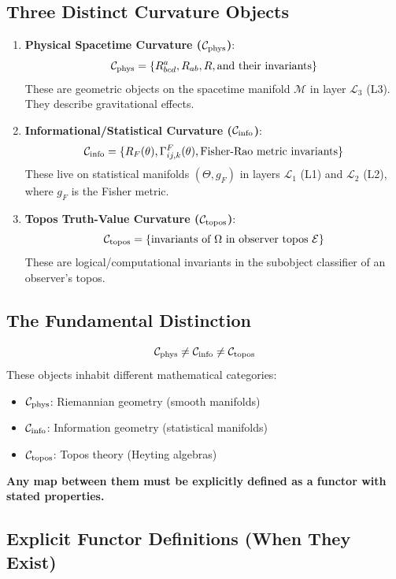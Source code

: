 \documentclass[11pt,titlepage]{article}
\newcommand{\protocol}{\mathcal{L}_1}
\newcommand{\logic}{\mathcal{L}_2}
\newcommand{\interface}{\mathcal{L}_3}
\begin{document}
\subsection{Three Distinct Curvature Objects}

\begin{enumerate}
    \item \textbf{Physical Spacetime Curvature ($\mathcal{C}_{\mathrm{phys}}$)}:
    \[
    \mathcal{C}_{\mathrm{phys}} = \{R^a_{bcd}, R_{ab}, R, \text{and their invariants}\}
    \]
    These are geometric objects on the spacetime manifold $\mathcal{M}$ in layer $\interface$ (L3). They describe gravitational effects.
    
    \item \textbf{Informational/Statistical Curvature ($\mathcal{C}_{\mathrm{info}}$)}:
    \[
    \mathcal{C}_{\mathrm{info}} = \{R_F(\theta), \Gamma^F_{ij,k}(\theta), \text{Fisher-Rao metric invariants}\}
    \]
    These live on statistical manifolds $(\Theta, g_F)$ in layers $\protocol$ (L1) and $\logic$ (L2), where $g_F$ is the Fisher metric.
    
    \item \textbf{Topos Truth-Value Curvature ($\mathcal{C}_{\mathrm{topos}}$)}:
    \[
    \mathcal{C}_{\mathrm{topos}} = \{\text{invariants of } \Omega \text{ in observer topos } \mathcal{E}\}
    \]
    These are logical/computational invariants in the subobject classifier of an observer's topos.
\end{enumerate}

\subsection{The Fundamental Distinction}

\begin{tcolorbox}[colback=red!5!white,colframe=red!75!black,title=Critical Notation Rule]
\[
\mathcal{C}_{\mathrm{phys}} \neq \mathcal{C}_{\mathrm{info}} \neq \mathcal{C}_{\mathrm{topos}}
\]
These objects inhabit different mathematical categories:
\begin{itemize}
    \item $\mathcal{C}_{\mathrm{phys}}$: Riemannian geometry (smooth manifolds)
    \item $\mathcal{C}_{\mathrm{info}}$: Information geometry (statistical manifolds) 
    \item $\mathcal{C}_{\mathrm{topos}}$: Topos theory (Heyting algebras)
\end{itemize}
\textbf{Any map between them must be explicitly defined as a functor with stated properties.}
\end{tcolorbox}

\subsection{Explicit Functor Definitions (When They Exist)}
\end{document}
